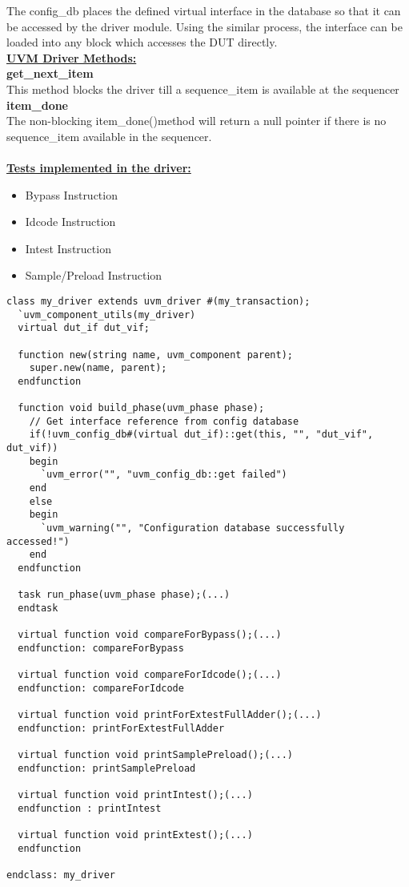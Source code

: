\documentclass[a4paper,11pt]{article}
\begin{document}
The config\_db places the defined virtual interface in the database so that it can be accessed by the driver module. Using the similar process, the interface can be loaded into any block which accesses the DUT directly.\\

\underline{\textbf{UVM Driver Methods:}}\\
\textbf{get\_next\_item} \\This method blocks the driver till a sequence\_item is available at the sequencer\\
\textbf{item\_done} \\The non-blocking item\_done()method will return a null pointer if there is no sequence\_item available in the sequencer.
\\
 \\
\underline{\textbf{Tests implemented in the driver:}}\\

\begin{itemize}[noitemsep]

\item Bypass Instruction
\item Idcode Instruction
\item Intest Instruction
\item Sample/Preload Instruction

\end{itemize}

\begin{lstlisting}[style={verilog-style}, backgroundcolor=\color{lightgray}]
class my_driver extends uvm_driver #(my_transaction);
  `uvm_component_utils(my_driver)
  virtual dut_if dut_vif;

  function new(string name, uvm_component parent);
    super.new(name, parent);
  endfunction

  function void build_phase(uvm_phase phase);
    // Get interface reference from config database
    if(!uvm_config_db#(virtual dut_if)::get(this, "", "dut_vif", dut_vif)) 
    begin
      `uvm_error("", "uvm_config_db::get failed")
    end
    else
    begin
      `uvm_warning("", "Configuration database successfully accessed!")
    end
  endfunction 

  task run_phase(uvm_phase phase);(...)
  endtask

  virtual function void compareForBypass();(...)
  endfunction: compareForBypass

  virtual function void compareForIdcode();(...)
  endfunction: compareForIdcode

  virtual function void printForExtestFullAdder();(...)
  endfunction: printForExtestFullAdder

  virtual function void printSamplePreload();(...)
  endfunction: printSamplePreload

  virtual function void printIntest();(...)
  endfunction : printIntest

  virtual function void printExtest();(...)
  endfunction

endclass: my_driver
\end{lstlisting}
\end{document}
